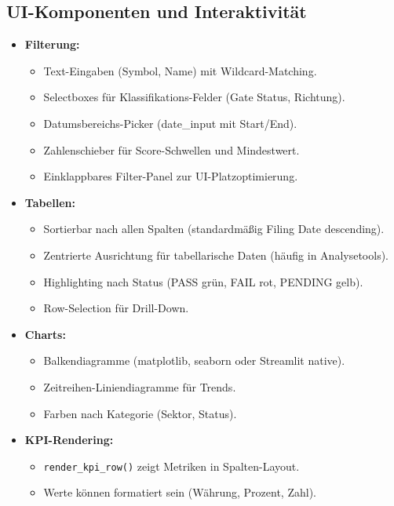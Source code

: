 \subsection{UI-Komponenten und Interaktivität}
\begin{itemize}
  \item \textbf{Filterung:}
    \begin{itemize}
      \item Text-Eingaben (Symbol, Name) mit Wildcard-Matching.
      \item Selectboxes für Klassifikations-Felder (Gate Status, Richtung).
      \item Datumsbereichs-Picker (date\_input mit Start/End).
      \item Zahlenschieber für Score-Schwellen und Mindestwert.
      \item Einklappbares Filter-Panel zur UI-Platzoptimierung. %
    \end{itemize}
  \item \textbf{Tabellen:} %
    \begin{itemize}
      \item Sortierbar nach allen Spalten (standardmäßig Filing Date descending). %
      \item Zentrierte Ausrichtung für tabellarische Daten (häufig in Analysetools). %
      \item Highlighting nach Status (PASS grün, FAIL rot, PENDING gelb). %
      \item Row-Selection für Drill-Down. %
    \end{itemize}
  \item \textbf{Charts:}
    \begin{itemize}
      \item Balkendiagramme (matplotlib, seaborn oder Streamlit native).
      \item Zeitreihen-Liniendiagramme für Trends.
      \item Farben nach Kategorie (Sektor, Status). %
    \end{itemize}
  \item \textbf{KPI-Rendering:}
    \begin{itemize}
      \item \texttt{render\_kpi\_row()} zeigt Metriken in Spalten-Layout. %
      \item Werte können formatiert sein (Währung, Prozent, Zahl). %
    \end{itemize}
\end{itemize}

